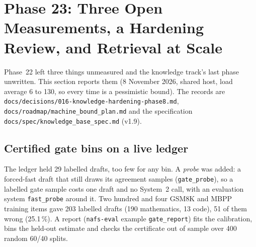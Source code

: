 \section{Phase 23: Three Open Measurements, a Hardening Review, and Retrieval at Scale}
\label{sec:phase23}

Phase~22 left three things unmeasured and the knowledge track's last phase unwritten. This section reports them (8 November 2026, shared host, load average
6 to 130, so every time is a pessimistic bound). The records are \texttt{docs/decisions/016-knowledge-hardening-phase8.md},
\texttt{docs/roadmap/machine\_bound\_plan.md} and the specification \texttt{docs/spec/knowledge\_base\_spec.md} (v1.9).

\subsection{Certified gate bins on a live ledger}

The ledger held 29 labelled drafts, too few for any bin. A \emph{probe} was added: a forced-fast draft that still draws its agreement samples
(\texttt{gate\_probe}), so a labelled gate sample costs one draft and no System~2 call, with an evaluation system \texttt{fast\_probe} around it. Two hundred
and four GSM8K and MBPP training items gave 203 labelled drafts (190 mathematics, 13 code), 51 of them wrong (25.1\,\%). A report
(\texttt{nafs-eval} example \texttt{gate\_report}) fits the calibration, bins the held-out estimate and checks the certificate out of sample over 400 random 60/40
splits.

